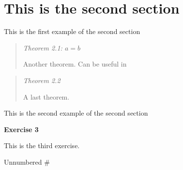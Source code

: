 \section{This is the second section}\label{this-is-the-second-section}

\begin{description}
\tightlist
\item[\phantomsection\addcontentsline{example}{example}{\protect\numberline {2.1}{\ignorespaces {Example}}}\phantomsection\label{example:this-is-the-second-section.1}{}\phantomsection\label{example:2.1}{\textbf{Example
1}}]
This is the first example of the second section
\end{description}

\begin{quote}
\label{theorem:this-is-the-second-section.a-b}{}\label{theorem:2.1}{\emph{Theorem
2.1: \(a=b\)}}

Another theorem. Can be useful in \hyperref[exercise:1]{}
\end{quote}

\begin{quote}
\label{theorem:this-is-the-second-section.2}{}\label{theorem:2.2}{\emph{Theorem
2.2}}

A last theorem.
\end{quote}

\begin{description}
\tightlist
\item[\phantomsection\addcontentsline{example}{example}{\protect\numberline {2.2}{\ignorespaces {Example}}}\phantomsection\label{example:this-is-the-second-section.2}{}\phantomsection\label{example:2.2}{\textbf{Example
2}}]
This is the second example of the second section
\end{description}

\label{exercise:3}{}\label{exercise:last}{\textbf{Exercise
3}}

This is the third exercise.

Unnumbered \#
